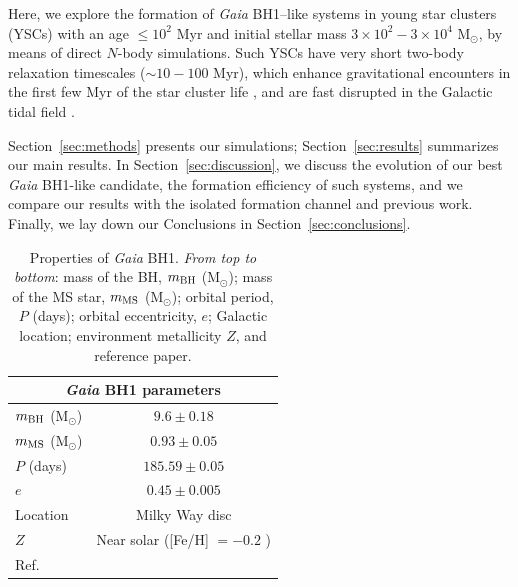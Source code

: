 \documentclass[fleqn,usenatbib]{mnras}
\newcommand{\Ms}{M$_\odot$}
\newcommand{\bh}{\textit{Gaia} BH1}
\begin{document}
Here, we explore the formation of \bh--like systems in young star clusters (YSCs) with an age $\leq10^2$ Myr and initial stellar mass $3\times{}10^2-3\times{}10^4$ M$_\odot$, by means of direct $N$-body simulations. Such YSCs have very short two-body relaxation timescales ($\sim{10-100}$ Myr), which enhance gravitational encounters in the first few Myr of the star cluster life \citep{rastello2021}, and are fast disrupted in the Galactic tidal field \citep{torniamenti2022}.  


Section~\ref{sec:methods} presents our simulations; Section~\ref{sec:results} summarizes our main results. In Section~\ref{sec:discussion}, we discuss the evolution of our best \bh-like candidate, the formation efficiency of such systems, and we compare our results with the isolated formation channel and  previous work. Finally, we lay down our Conclusions in Section~\ref{sec:conclusions}.



\begin{table}
	\centering
	\caption{Properties of \bh. \textit{From top to bottom}: 
     mass of the BH,  
	$m_{\rm{BH}}$ (\Ms); mass of the MS star, $m_{\rm{MS}}$ (\Ms); orbital 
	period, $P$ (days); orbital eccentricity, $e$; %
 Galactic location; environment metallicity $Z$, and reference paper.}
	\label{tab:bh1}
	\begin{tabular}{lc}
    \hline
        \multicolumn{2}{c}{\textbf{\bh}   \bf{     parameters}}                           \\ \hline
		$m_{\rm{BH}}$  (\Ms) & $9.6 \pm{} 0.18$    \\ 
		$m_{\rm{MS}}$ (\Ms)  & $0.93 \pm{} 0.05$   \\
		$P$ (days)                         & $185.59 \pm{} 0.05$ \\
		$e$                                 & $0.45 \pm{} 0.005$  \\
		Location                              & Milky Way disc    \\
		$Z$                                  & Near solar ([Fe/H] $= - 0.2$ )        \\
		Ref.                                & \cite{elbadry2023a}         \\ 
		\hline
	\end{tabular}
\end{table}

\end{document}
